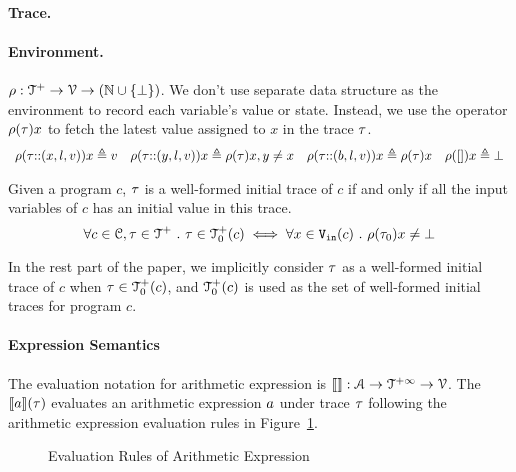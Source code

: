 \paragraph{Trace.}

%
\paragraph{Environment.} $\rho : {\mathcal{T}^{+}}  \to \mathcal{V} \to(\mathbb{N} \cup \{\bot\})$.  
We don't use separate data structure as the environment to record each variable's value or state. Instead, we use the operator $\rho (\mathtt{\tau}) x$ to fetch the latest value assigned to $x$ in the trace $\mathtt{\tau}$. 
\[
\begin{array}{llll}
\rho(\mathtt{\tau}  {\small ::} (x, l, v)) x \triangleq v
&
\rho(\mathtt{\tau} {\small ::} (y, l, v)) x \triangleq \rho(\mathtt{\tau}) x, y \neq x
&
\rho(\mathtt{\tau} {\small ::} (b, l, v)) x \triangleq \rho(\mathtt{\tau}) x
&
\rho({[]} ) x \triangleq \bot
\end{array}
\]
%
\begin{defn}
  \label{def:initial_trace}
  Given a program $c$, $\mathtt{\tau}$ is a well-formed initial trace of $c$ if and only if all the input variables of $c$ has an initial value in this trace.
  \[
    \forall c \in \mathcal{C}, \mathtt{\tau} \in \mathcal{T}^{+} ~.~ \mathtt{\tau} \in \mathcal{T}^{+}_0(c) \iff 
    \forall x \in {\ensuremath{\mathtt{V_{\mathtt{in}}}}}(c) ~.~ \rho(\mathtt{\tau}_0) x \neq \bot
    \]
\end{defn}
%
In the rest part of the paper, we implicitly consider $\mathtt{\tau}$ as a well-formed initial trace of $c$ 
when $\mathtt{\tau} \in \mathcal{T}^{+}_0(c)$, and $\mathcal{T}^{+}_0(c)$ is used as the set of well-formed initial traces for program $c$.
%
\paragraph{Expression Semantics}
The evaluation notation for arithmetic expression is $\llbracket  \rrbracket : \mathcal{A} \to \mathcal{T}^{+\infty} \to \mathcal{V}$.
The $\llbracket a \rrbracket(\mathtt{\tau})$ evaluates an arithmetic expression $a$ under trace $\mathtt{\tau}$ following the arithmetic expression evaluation rules in Figure~\ref{fig:aexpr-eval}.
\begin{figure}
   \caption{Evaluation Rules of Arithmetic Expression}
   \label{fig:aexpr-eval}
   \end{figure}

